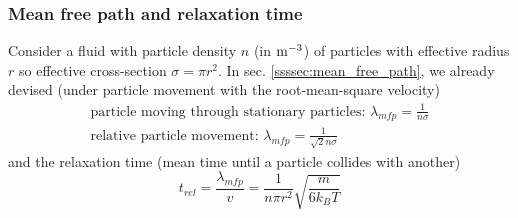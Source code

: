 \subsubsection{Mean free path and relaxation time}
Consider a fluid with particle density $n$ (in $\operatorname{m}^{-3}$) of particles with effective radius $r$ so effective
cross-section $\sigma = \pi r^2$. In sec. \ref{ssssec:mean_free_path}, we already devised (under particle
movement with the root-mean-square velocity)
\begin{equation}
    \begin{gathered}
        \text{particle moving through stationary particles: } \lambda_{mfp} = \frac{1}{n\sigma} \\
        \text{relative particle movement: } \lambda_{mfp} = \frac{1}{\sqrt{2} n\sigma}
    \end{gathered}
\end{equation}
and the relaxation time (mean time until a particle collides with another)
\begin{equation}
    t_{rel} = \frac{\lambda_{mfp}}{v} = \frac{1}{n\pi r^2} \sqrt{\frac{m}{6k_B T}}
\end{equation}

